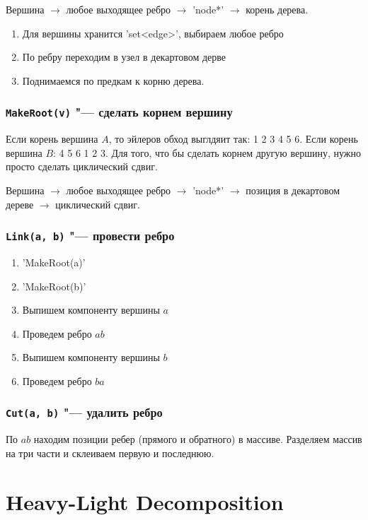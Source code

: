 Вершина $\to$ любое выходящее ребро $\to$ \cpp'node*' $\to$ корень дерева.
\begin{enumerate}
	\item Для вершины хранится \cpp'set<edge>', выбираем любое ребро
	\item По ребру переходим в узел в декартовом дерве
	\item Поднимаемся по предкам к корню дерева.
\end{enumerate}

\subsubsection{\texttt{MakeRoot(v)} "--- сделать корнем вершину}


Если корень вершина $A$, то эйлеров обход выглдяит так: 1 2 3 4 5 6.
Если корень вершина $B$: 4 5 6 1 2 3.
Для того, что бы сделать корнем другую вершину, нужно просто сделать циклический сдвиг.

Вершина $\to$ любое выходящее ребро $\to$ \cpp'node*' $\to$ позиция в декартовом дереве $\to$ циклический сдвиг.

\subsubsection{\texttt{Link(a, b)} "--- провести ребро}

\begin{enumerate}
	\item \cpp'MakeRoot(a)'
	\item \cpp'MakeRoot(b)'
	\item Выпишем компоненту вершины $a$
	\item Проведем ребро $ab$
	\item Выпишем компоненту вершины $b$
	\item Проведем ребро $ba$
\end{enumerate}

\subsubsection{\texttt{Cut(a, b)} "--- удалить ребро}


По $ab$ находим позиции ребер (прямого и обратного) в массиве.
Разделяем массив на три части и склеиваем первую и последнюю.

\section{Heavy-Light Decomposition}

